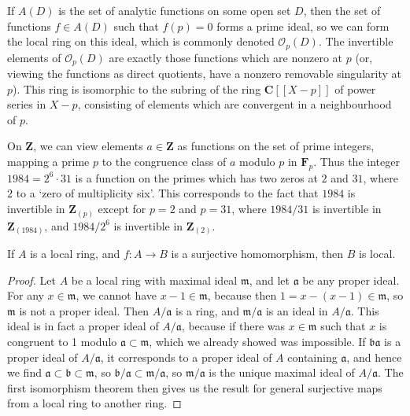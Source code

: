 \begin{example}
    If $A(D)$ is the set of analytic functions on some open set $D$, then the set of functions $f \in A(D)$ such that $f(p) = 0$ forms a prime ideal, so we can form the local ring on this ideal, which is commonly denoted $\mathcal{O}_p(D)$. The invertible elements of $\mathcal{O}_p(D)$ are exactly those functions which are nonzero at $p$ (or, viewing the functions as direct quotients, have a nonzero removable singularity at $p$). This ring is isomorphic to the subring of the ring $\mathbf{C}[[X-p]]$ of power series in $X-p$, consisting of elements which are convergent in a neighbourhood of $p$.
\end{example}

\begin{example}
    On $\mathbf{Z}$, we can view elements $a \in \mathbf{Z}$ as functions on the set of prime integers, mapping a prime $p$ to the congruence class of $a$ modulo $p$ in $\mathbf{F}_p$. Thus the integer $1984 = 2^6 \cdot 31$ is a function on the primes which has two zeros at $2$ and $31$, where $2$ to a `zero of multiplicity six'. This corresponds to the fact that $1984$ is invertible in $\mathbf{Z}_{(p)}$ except for $p = 2$ and $p = 31$, where $1984/31$ is invertible in $\mathbf{Z}_{(1984)}$, and $1984/2^6$ is invertible in $\mathbf{Z}_{(2)}$.
\end{example}

\begin{prop}
    If $A$ is a local ring, and $f: A \to B$ is a surjective homomorphism, then $B$ is local.
\end{prop}
\begin{proof}
    Let $A$ be a local ring with maximal ideal $\mathfrak{m}$, and let $\mathfrak{a}$ be any proper ideal. For any $x \in \mathfrak{m}$, we cannot have $x - 1 \in \mathfrak{m}$, because then $1 = x - (x - 1) \in \mathfrak{m}$, so $\mathfrak{m}$ is not a proper ideal. Then $A/\mathfrak{a}$ is a ring, and $\mathfrak{m}/\mathfrak{a}$ is an ideal in $A/\mathfrak{a}$. This ideal is in fact a proper ideal of $A/\mathfrak{a}$, because if there was $x \in \mathfrak{m}$ such that $x$ is congruent to 1 modulo $\mathfrak{a} \subset \mathfrak{m}$, which we already showed was impossible. If $\mathfrak{b}\mathfrak{a}$ is a proper ideal of $A/\mathfrak{a}$, it corresponds to a proper ideal of $A$ containing $\mathfrak{a}$, and hence we find $\mathfrak{a} \subset \mathfrak{b} \subset \mathfrak{m}$, so $\mathfrak{b}/\mathfrak{a} \subset \mathfrak{m}/\mathfrak{a}$, so $\mathfrak{m}/\mathfrak{a}$ is the unique maximal ideal of $A/\mathfrak{a}$. The first isomorphism theorem then gives us the result for general surjective maps from a local ring to another ring.
\end{proof}

